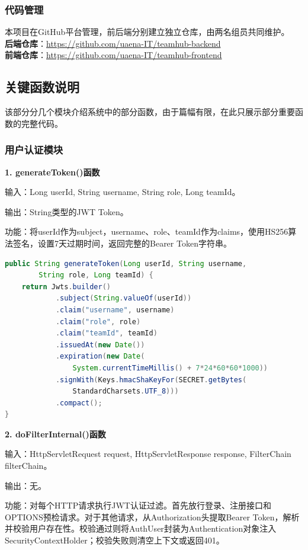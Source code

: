 \documentclass[12pt,a4paper]{ctexart}
\begin{document}
\subsubsection{代码管理}

本项目在GitHub平台管理，前后端分别建立独立仓库，由两名组员共同维护。\\\textbf{后端仓库}：\url{https://github.com/uaena-IT/teamhub-backend}\\\textbf{前端仓库}：\url{https://github.com/uaena-IT/teamhub-frontend}



\subsection{关键函数说明}

该部分分几个模块介绍系统中的部分函数，由于篇幅有限，在此只展示部分重要函数的完整代码。

\subsubsection{用户认证模块}

\textbf{1. generateToken()函数}

输入：Long userId, String username, String role, Long teamId。

输出：String类型的JWT Token。

功能：将userId作为subject，username、role、teamId作为claims，使用HS256算法签名，设置7天过期时间，返回完整的Bearer Token字符串。

\begin{lstlisting}[language=Java]
public String generateToken(Long userId, String username,
        String role, Long teamId) {
    return Jwts.builder()
            .subject(String.valueOf(userId))
            .claim("username", username)
            .claim("role", role)
            .claim("teamId", teamId)
            .issuedAt(new Date())
            .expiration(new Date(
                System.currentTimeMillis() + 7*24*60*60*1000))
            .signWith(Keys.hmacShaKeyFor(SECRET.getBytes(
                StandardCharsets.UTF_8)))
            .compact();
}
\end{lstlisting}

\textbf{2. doFilterInternal()函数}

输入：HttpServletRequest request, HttpServletResponse response, FilterChain filterChain。

输出：无。

功能：对每个HTTP请求执行JWT认证过滤。首先放行登录、注册接口和OPTIONS预检请求。对于其他请求，从Authorization头提取Bearer Token，解析并校验用户存在性。校验通过则将AuthUser封装为Authentication对象注入SecurityContextHolder；校验失败则清空上下文或返回401。
\end{document}
